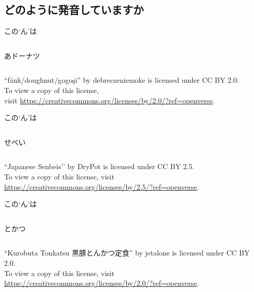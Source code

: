 \documentclass[aspectratio=169,xcolor={dvipsnames,table}]{beamer}
\begin{document}
\subsection{どのように発音していますか}
\begin{frame}[plain]{この`ん'は}
\begin{columns}\Huge
 \begin{column}{.4\textwidth}
 あドーナツ

\hspace{18pt}
 \end{column}
\begin{column}{.55\textwidth}
\end{column}
\end{columns}
\raggedleft
{\tiny ``fánk/doughnut/gogoşi'' by debreczeniemoke is licensed under CC BY 2.0.}\\[-5pt]
{\tiny To view a copy of this license,}\\[-5pt]
{\tiny visit \url{https://creativecommons.org/licenses/by/2.0/?ref=openverse}.}
\end{frame}
\begin{frame}[plain]{この`ん'は}
\begin{columns}\Huge
 \begin{column}{.3\textwidth}
 せべい

\hspace{16pt}
 \end{column}
\begin{column}{.6\textwidth}
\end{column}
\end{columns}
\raggedleft
{\tiny ``Japanese Senbeis’’ by DryPot is licensed under CC BY 2.5.}\\[-5pt]
{\tiny To view a copy of this license, visit \url{https://creativecommons.org/licenses/by/2.5/?ref=openverse}.}
\end{frame}
\begin{frame}[plain]{この`ん'は}

\begin{columns}\Huge
 \begin{column}{.3\textwidth}
 とかつ

\hspace{18pt}
 \end{column}
\begin{column}{.6\textwidth}
\end{column}
\end{columns}
\raggedleft
{\tiny ``Kurobuta Tonkatsu 黒豚とんかつ定食'' by jetalone is licensed under CC BY 2.0.}\\[-5pt]
{\tiny To view a copy of this license, visit \url{https://creativecommons.org/licenses/by/2.0/?ref=openverse}.}
\end{frame}
\end{document}
